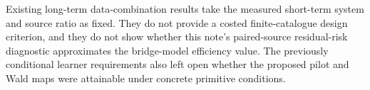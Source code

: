 Existing long-term data-combination results take the measured short-term system and source ratio as fixed.  They do not provide a costed finite-catalogue design criterion, and they do not show whether this note's paired-source residual-risk diagnostic approximates the bridge-model efficiency value.  The previously conditional learner requirements also left open whether the proposed pilot and Wald maps were attainable under concrete primitive conditions.